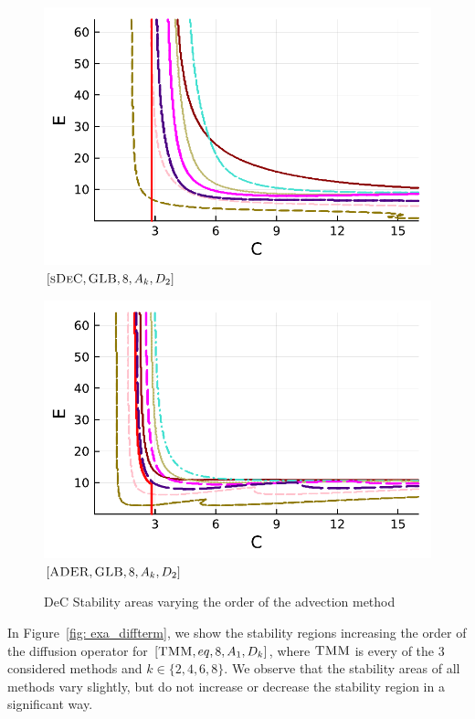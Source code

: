 \begin{figure}[!h]
\begin{minipage}[t]{0.32\textwidth}
		\includegraphics[width=\textwidth]{pdf/pdepics/diff/IMEXDeC_subtimesteps_gaussLobatto_adv_ord_1-8.pdf}
		\centering
		$[\textsc{sDeC},\textsc{GLB},8, A_k,D_2]$
	\end{minipage}
	\begin{minipage}[t]{0.32\textwidth}
		\includegraphics[width=\textwidth]{pdf/pdepics/diff/IMEXADER_gaussLobatto_adv_ord_1-8.pdf}
		\centering
		$[\textsc{ADER},\textsc{GLB},8, A_k,D_2]$
	\end{minipage}
	\caption{DeC Stability areas varying the order of the advection method}
	\label{fig: exa_advterm}
\end{figure}


In Figure~\ref{fig: exa_diffterm}, we show the stability regions increasing the order of the diffusion operator for $[\textsc{TMM},eq, 8, A_1,D_k]$, where $\textsc{TMM}$ is every of the 3 considered methods and $k \in \{2,4,6,8\}$.  We observe that the stability areas of all methods vary slightly, but do not increase or decrease the stability region in a significant way.

